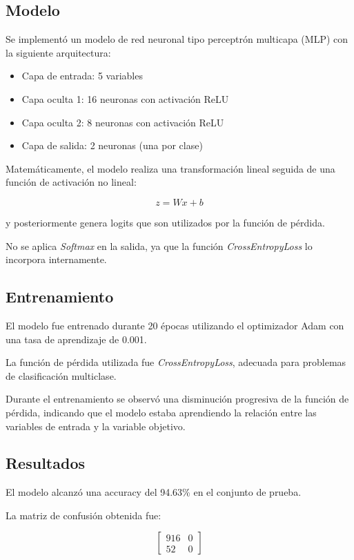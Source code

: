 \documentclass{article}
\begin{document}
\subsection{Modelo}

Se implementó un modelo de red neuronal tipo perceptrón multicapa (MLP) con la siguiente arquitectura:

\begin{itemize}
    \item Capa de entrada: 5 variables
    \item Capa oculta 1: 16 neuronas con activación ReLU
    \item Capa oculta 2: 8 neuronas con activación ReLU
    \item Capa de salida: 2 neuronas (una por clase)
\end{itemize}

Matemáticamente, el modelo realiza una transformación lineal seguida de una función de activación no lineal:

\[
z = Wx + b
\]

y posteriormente genera logits que son utilizados por la función de pérdida.

No se aplica \textit{Softmax} en la salida, ya que la función \textit{CrossEntropyLoss} lo incorpora internamente.

\subsection{Entrenamiento}

El modelo fue entrenado durante 20 épocas utilizando el optimizador Adam con una tasa de aprendizaje de 0.001.

La función de pérdida utilizada fue \textit{CrossEntropyLoss}, adecuada para problemas de clasificación multiclase.

Durante el entrenamiento se observó una disminución progresiva de la función de pérdida, indicando que el modelo estaba aprendiendo la relación entre las variables de entrada y la variable objetivo.

\subsection{Resultados}

El modelo alcanzó una accuracy del 94.63\% en el conjunto de prueba.

La matriz de confusión obtenida fue:

\[
\begin{bmatrix}
916 & 0 \\
52 & 0
\end{bmatrix}
\]
\end{document}
